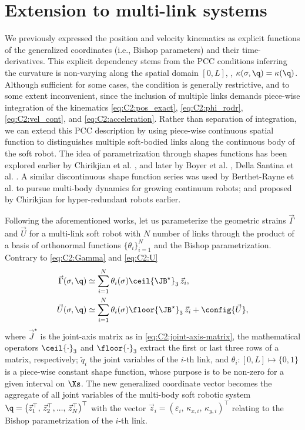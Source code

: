 \section{Extension to multi-link systems}
\label{sec: chap2 section header}
\noindent We previously expressed the position and velocity kinematics as explicit functions of the generalized coordinates (i.e., Bishop parameters) and their time-derivatives. This explicit dependency stems from the PCC conditions inferring the curvature is non-varying along the spatial domain $[0,L]$, \ie, $\kappa(\sigma,\q) = \kappa(\q)$. Although sufficient for some cases, the condition is generally restrictive, and to some extent inconvenient, since the inclusion of multiple links demands piece-wise integration of the kinematics \eqref{eq:C2:pos_exact}, \eqref{eq:C2:phi_rodr}, \eqref{eq:C2:vel_cont}, and \eqref{eq:C2:acceleration}. Rather than separation of integration, we can extend this PCC description by using piece-wise continuous spatial function to distinguishes multiple soft-bodied links along the continuous body of the soft robot. The idea of parametrization through shapes functions has been explored earlier by Chirikjian et al.
\cite{Chirikjian1994,Chirikjian1992}, and later by Boyer et al. \cite{Boyer2021}, Della Santina et al. \cite{DellaSantina2020}. A similar discontinuous shape function series was used by Berthet-Rayne et al. \cite{Berthet2021} to pursue multi-body dynamics for growing continuum robots; and proposed by Chirikjian \cite{Chirikjian1992} for hyper-redundant robots earlier.

Following the aforementioned works, let us parameterize the geometric strains $\vec{\Gamma}$ and $\vec{U}$ for \editl a multi-link soft robot with $N$ number of links \editr through the product of a basis of orthonormal functions $\!\{\theta_i\}_{i=1}^{N}$ and the Bishop parametrization. Contrary to \eqref{eq:C2:Gamma} and \eqref{eq:C2:U}
%
\begin{align} \vec{\Gamma}(\sigma,\q) & \simeq \sum^N_{i=1} \theta_i(\sigma) \ceil{\JB^\star}_3
\,\vec{z}_i, \label{eq:C2:theta_extent} \\ \vec{U}(\sigma,\q) & \simeq \sum^N_{i=1} \theta_i(\sigma)
\floor{\JB^\star}_3\,\vec{z}_i + \config{\vec{U}}, \label{eq:C2:h_extent} \end{align}
%
where $\vec{J}^\star$ is the joint-axis matrix as in \eqref{eq:C2:joint-axis-matrix}, the mathematical operators $\ceil{\cdot}_3$ and $\floor{\cdot}_3$  extract the first or last three rows of a matrix, respectively;  $\tilde{q}_i$ the joint variables of the $i$-th link, and $\theta_i: [0,L] \mapsto \{0,1\}$ is a piece-wise constant shape function, whose purpose is to be non-zero for a given interval on
$\Xs$.
The new generalized coordinate vector becomes the aggregate of all joint variables of the multi-body soft robotic system $\q =  \left(\vec{z}_1^\top,\,\vec{z}_2^\top,...,\,\vec{z}_N^\top \right)^\top$ with the vector $\vec{z}_i = (\varepsilon_{i},\, \kappa_{x,i},\,\kappa_{y,i})^\top$ relating to the Bishop parametrization of the $i$-th link.

